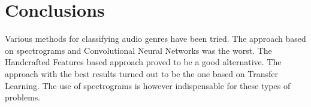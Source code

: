 \section{Conclusions}

Various methods for classifying audio genres have been tried.
The approach based on spectrograms and Convolutional Neural Networks was the worst. 
The Handcrafted Features based approach proved to be a good alternative. 
The approach with the best results turned out to be the one based on Transfer Learning.
The use of spectrograms is however indispensable for these types of problems.
